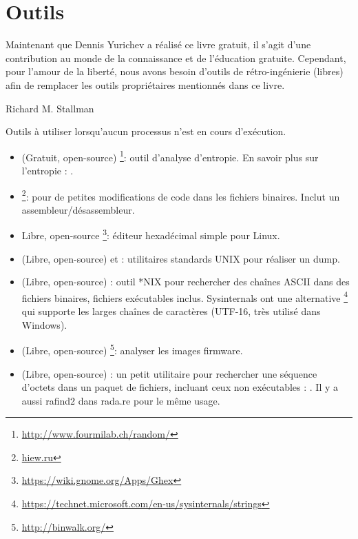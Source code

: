 \chapter{Outils}

\epigraph{Maintenant que Dennis Yurichev a réalisé ce livre gratuit, il s'agit d'une contribution au monde de la connaissance et de l'éducation gratuite.
Cependant, pour l'amour de la liberté, nous avons besoin d'outils de rétro-ingénierie (libres) afin de remplacer les outils propriétaires mentionnés dans ce livre.}{Richard M. Stallman}


Outils à utiliser lorsqu'aucun processus n'est en cours d'exécution.


\begin{itemize}
\item
(Gratuit, open-source) \footnote{\url{http://www.fourmilab.ch/random/}}: outil d'analyse d'entropie.
En savoir plus sur l'entropie : .

\item
\label{Hiew}
\footnote{\href{http://go.yurichev.com/17035}{hiew.ru}}:
pour de petites modifications de code dans les fichiers binaires.
Inclut un assembleur/désassembleur.

\item {Libre, open-source} \footnote{\url{https://wiki.gnome.org/Apps/Ghex}}: éditeur
hexadécimal simple pour Linux.

\item (Libre, open-source)  et : utilitaires standards UNIX pour réaliser un dump.

\item (Libre, open-source) : outil *NIX pour rechercher des chaînes ASCII dans des fichiers binaires, fichiers exécutables inclus.
Sysinternals ont une alternative \footnote{\url{https://technet.microsoft.com/en-us/sysinternals/strings}}
qui supporte les larges chaînes de caractères (UTF-16, très utilisé dans Windows).

\item (Libre, open-source) \footnote{\url{http://binwalk.org/}}: analyser les images firmware.

\item
{}
(Libre, open-source) :
un petit utilitaire pour rechercher une séquence d'octets dans un paquet de fichiers,
incluant ceux non exécutables : \BGREPURL.
Il y a aussi rafind2 dans rada.re pour le même usage.
\end{itemize}

